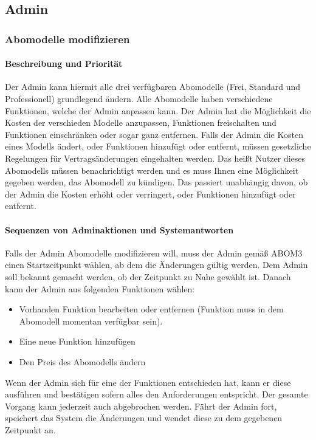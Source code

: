 \subsection{Admin}
\subsubsection{Abomodelle modifizieren}
\paragraph{Beschreibung und Priorität}
Der Admin kann hiermit alle drei verfügbaren Abomodelle (Frei, Standard und Professionell) grundlegend ändern. Alle Abomodelle haben verschiedene Funktionen, welche der Admin anpassen kann. Der Admin hat die Möglichkeit die Kosten der verschieden Modelle anzupassen, Funktionen freischalten und Funktionen einschränken oder sogar ganz entfernen. Falls der Admin die Kosten eines Modells ändert, oder Funktionen hinzufügt oder entfernt, müssen gesetzliche Regelungen für Vertragsänderungen eingehalten werden. Das heißt Nutzer dieses Abomodells müssen benachrichtigt werden und es muss Ihnen eine Möglichkeit gegeben werden, das Abomodell zu kündigen. Das passiert unabhängig davon, ob der Admin die Kosten erhöht oder verringert, oder Funktionen hinzufügt oder entfernt. 
\paragraph{Sequenzen von Adminaktionen und Systemantworten}
Falls der Admin Abomodelle modifizieren will, muss der Admin gemäß ABOM3 einen Startzeitpunkt wählen, ab dem die Änderungen gültig werden. Dem Admin soll bekannt gemacht werden, ob der Zeitpunkt zu Nahe gewählt ist. Danach kann der Admin aus folgenden Funktionen wählen:
\begin{itemize}
	\item Vorhanden Funktion bearbeiten oder entfernen (Funktion muss in dem Abomodell momentan verfügbar sein).
	\item Eine neue Funktion hinzufügen
	\item Den Preis des Abomodells ändern
\end{itemize}
Wenn der Admin sich für eine der Funktionen entschieden hat, kann er diese ausführen und bestätigen sofern alles den Anforderungen entspricht. Der gesamte Vorgang kann jederzeit auch abgebrochen werden. Fährt der Admin fort, speichert das System die Änderungen und wendet diese zu dem gegebenen Zeitpunkt an.


